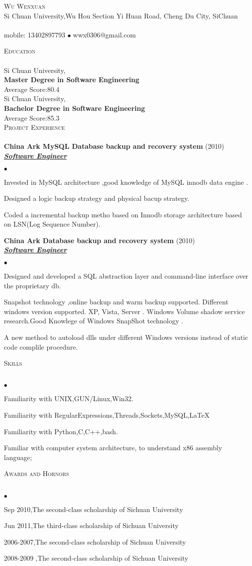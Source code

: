 \documentclass{article}
\newcommand{\lineunder}{\vspace*{-8pt} \\ \hspace*{-18pt} \hrulefill \\}
\newcommand{\header}[1]{{\hspace*{-15pt}\vspace*{6pt} \textsc{#1}} \vspace*{-6pt} \lineunder}
\newcommand{\project}[3]{{ \textbf{#1} (#2)\\ \underline{\textbf{\emph{#3}}}\\  }}
\newcommand{\contact}[3]{
\vspace*{-8pt}
\begin{center}
{\LARGE \scshape {#1}}\\
#2 \lineunder 
#3
\end{center}
\vspace*{-8pt}
}
\newenvironment{achievements}{\begin{list}{$\bullet$}{\topsep 0pt \itemsep -2pt}}{\vspace*{4pt}\end{list}}
\newcommand{\schoolwithcourses}[4]{
 \textbf{#1} #2 $\bullet$ #3\\ 
#4 $\bullet$  Selected Coursework:\\
\vspace*{5pt}
}
\newcommand{\school}[4]{#1\hspace*{2pt},\hspace*{2pt}{#2} 
						\\\hspace*{6pt} \textbf{#3}
						\\ \hspace*{6pt}#4\\
						}
\begin{document}
\contact{Wu Wenxuan}
{Si Chuan University,Wu Hou Section Yi Huan Road, Cheng Du City, SiChuan}
{mobile: 13402897793 $\bullet$ wwx0306@gmail.com }
\header{Education}
\school{Si Chuan University}{2010-2013}{Master Degree in Software Engineering}{Average Score:80.4}
\school{Si Chuan University}{2006-2010}{Bachelor Degree in Software Engineering}{Average Score:85.3}
\header{Project Experience}
\project{China Ark MySQL Database backup and recovery system}{2010}{Software Engineer}
	\begin{achievements}
	  \item Invested in MySQL architecture ,good knowledge of MySQL innodb data engine .
	  \item Designed a logic backup strategy and physical bacup strategy.
	  \item Coded a incremental backup metho based on Innodb storage architecture based on LSN(Log Sequence Number).
	  \end{achievements}
\project{China Ark Database backup and recovery system }{2010}{Software Engineer}
	\begin{achievements}
	  \item Designed and developed a SQL abstraction layer and command-line interface over the proprietary db.
	  \item Snapshot technology ,online backup and warm backup supported. Different windows version supported. XP, Vista, Server . Windows Volume shadow service research.Good Knowlege of Windows SnapShot technology . 
	  \item A new method to autoload dlls under different Windows versions instead of static code complile procedure.
	\end{achievements}
\header{Skills}
	\begin{achievements}
		\item Familiarity with UNIX,GUN/Linux,Win32.
		\item Familiarity with RegularExpressions,Threads,Sockets,MySQL,\LaTeX
		\item Familiarity with Python,C,C++,bash.
		\item Familiar with computer system architecture, to understand x86 assembly language;
	\end{achievements}
\header{Awards and Hornors}
	\begin{achievements}	
		\item Sep 2010,The second-class scholarship of Sichuan University
		\item Jun 2011,The third-class scholarship of Sichuan University
		\item 2006-2007,The second-class scholarship of Sichuan University
		\item 2008-2009 ,The second-class scholarship of Sichuan University
	\end{achievements}
\end{document}

